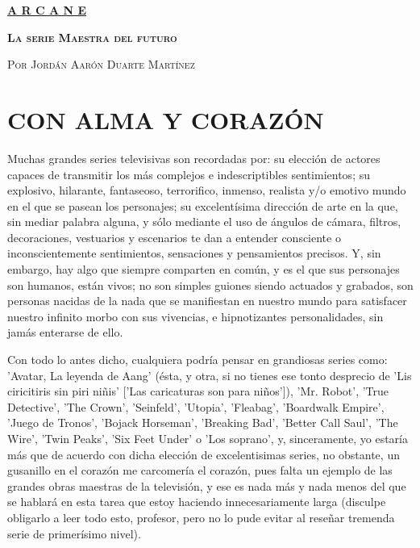 \documentclass[11pt,a5paper]{article}
\begin{document}
\pagecolor{black}
\color{white}


\begin{center}
    {\textcolor{doradu_mamalun}{\textbf{\textsc{\underline{\Huge{A R C A N E}}}}}}
\end{center}

\begin{center}
    {\textcolor{doradu_mamalun}{\textbf{\textsc{\large{La serie Maestra del futuro}}}}}
\end{center}

\begin{center}
    {\textcolor{doradu_semimamalun}{\textsc{Por Jordán Aarón Duarte Martínez}}}
\end{center}

\section*{\Large{\textsf{\hspace{1.8cm}CON ALMA Y CORAZÓN}}}

Muchas grandes series televisivas son recordadas por: su elección de actores capaces de transmitir los más complejos e indescriptibles sentimientos; su explosivo, hilarante, fantaseoso, terrorifico, inmenso, realista y/o emotivo mundo en el que se pasean los personajes; su excelentísima dirección de arte en la que, sin mediar palabra alguna, y sólo mediante el uso de ángulos de cámara, filtros, decoraciones, vestuarios y escenarios te dan a entender consciente o inconscientemente sentimientos, sensaciones y pensamientos precisos. Y, sin embargo, hay algo que siempre comparten en común, y es el que sus personajes son humanos, están vivos; no son simples guiones siendo actuados y grabados, son personas nacidas de la nada que se manifiestan en nuestro mundo para satisfacer nuestro infinito morbo con sus vivencias, e hipnotizantes personalidades, sin jamás enterarse de ello.\newline

Con todo lo antes dicho, cualquiera podría pensar en grandiosas series como: 'Avatar, La leyenda de Aang' (ésta, y otra, si no tienes ese tonto desprecio de 'Lis ciricitiris sin piri niñis' ['Las caricaturas son para niños']), 'Mr. Robot', 'True Detective', 'The Crown', 'Seinfeld', 'Utopia', 'Fleabag', 'Boardwalk Empire', 'Juego de Tronos', 'Bojack Horseman', 'Breaking Bad', 'Better Call Saul', 'The Wire', 'Twin Peaks', 'Six Feet Under' o 'Los soprano', y, sinceramente, yo estaría más que de acuerdo con dicha elección de excelentisimas series, no obstante, un gusanillo en el corazón me carcomería el corazón, pues falta un ejemplo de las grandes obras maestras de la televisión, y ese es nada más y nada menos del que se hablará en esta tarea que estoy haciendo innecesariamente larga (disculpe obligarlo a leer todo esto, profesor, pero no lo pude evitar al reseñar tremenda serie de primerísimo nivel).\newline
\end{document}
